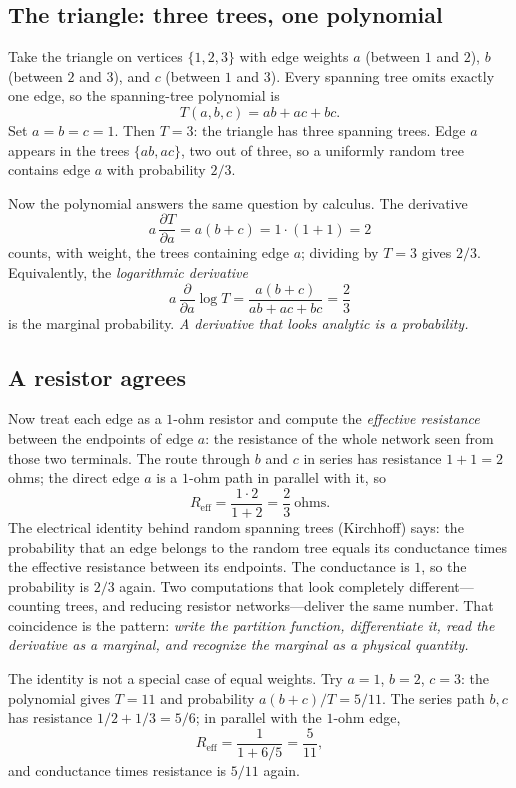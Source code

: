 \subsection{The triangle: three trees, one polynomial}
Take the triangle on vertices $\{1,2,3\}$ with edge weights $a$ (between $1$ and $2$), $b$ (between $2$ and $3$), and $c$ (between $1$ and $3$). Every spanning tree omits exactly one edge, so the spanning-tree polynomial is
\[
T(a,b,c)=ab+ac+bc.
\]
Set $a=b=c=1$. Then $T=3$: the triangle has three spanning trees. Edge $a$ appears in the trees $\{ab,ac\}$, two out of three, so a uniformly random tree contains edge $a$ with probability $2/3$.

Now the polynomial answers the same question by calculus. The derivative
\[
a\,\frac{\partial T}{\partial a}=a(b+c)=1\cdot(1+1)=2
\]
counts, with weight, the trees containing edge $a$; dividing by $T=3$ gives $2/3$. Equivalently, the \emph{logarithmic derivative}
\[
a\,\frac{\partial}{\partial a}\log T=\frac{a(b+c)}{ab+ac+bc}=\frac{2}{3}
\]
is the marginal probability. \emph{A derivative that looks analytic is a probability.}

\subsection{A resistor agrees}
Now treat each edge as a $1$-ohm resistor and compute the \emph{effective resistance} between the endpoints of edge $a$: the resistance of the whole network seen from those two terminals. The route through $b$ and $c$ in series has resistance $1+1=2$ ohms; the direct edge $a$ is a $1$-ohm path in parallel with it, so
\[
R_{\mathrm{eff}}=\frac{1\cdot 2}{1+2}=\frac{2}{3}\ \text{ohms}.
\]
The electrical identity behind random spanning trees (Kirchhoff) says: the probability that an edge belongs to the random tree equals its conductance times the effective resistance between its endpoints. The conductance is $1$, so the probability is $2/3$ again. Two computations that look completely different---counting trees, and reducing resistor networks---deliver the same number. That coincidence is the pattern: \emph{write the partition function, differentiate it, read the derivative as a marginal, and recognize the marginal as a physical quantity.}

The identity is not a special case of equal weights. Try $a=1$, $b=2$, $c=3$: the polynomial gives $T=11$ and probability $a(b+c)/T=5/11$. The series path $b,c$ has resistance $1/2+1/3=5/6$; in parallel with the $1$-ohm edge,
\[
R_{\mathrm{eff}}=\frac{1}{1+6/5}=\frac{5}{11},
\]
and conductance times resistance is $5/11$ again.

